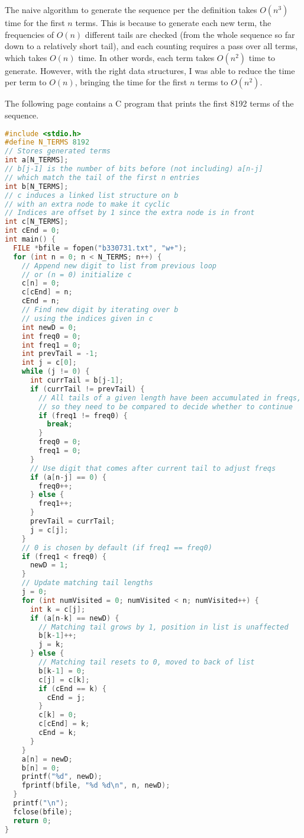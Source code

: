 \documentclass{article}
\begin{document}
The naive algorithm to generate the sequence per the definition
takes $O(n^3)$ time for the first $n$ terms.
This is because to generate each new term,
the frequencies of $O(n)$ different tails are checked
(from the whole sequence so far down to a relatively short tail),
and each counting requires a pass over all terms,
which takes $O(n)$ time.
In other words, each term takes $O(n^2)$ time to generate.
However, with the right data structures,
I was able to reduce the time per term to $O(n)$,
bringing the time for the first $n$ terms to $O(n^2)$.

The following page contains a C program
that prints the first 8192 terms of the sequence.

\newpage

\begin{lstlisting}[language=c]
#include <stdio.h>
#define N_TERMS 8192
// Stores generated terms
int a[N_TERMS];
// b[j-1] is the number of bits before (not including) a[n-j]
// which match the tail of the first n entries
int b[N_TERMS];
// c induces a linked list structure on b
// with an extra node to make it cyclic
// Indices are offset by 1 since the extra node is in front
int c[N_TERMS];
int cEnd = 0;
int main() {
  FILE *bfile = fopen("b330731.txt", "w+");
  for (int n = 0; n < N_TERMS; n++) {
    // Append new digit to list from previous loop
    // or (n = 0) initialize c
    c[n] = 0;
    c[cEnd] = n;
    cEnd = n;
    // Find new digit by iterating over b
    // using the indices given in c
    int newD = 0;
    int freq0 = 0;
    int freq1 = 0;
    int prevTail = -1;
    int j = c[0];
    while (j != 0) {
      int currTail = b[j-1];
      if (currTail != prevTail) {
        // All tails of a given length have been accumulated in freqs,
        // so they need to be compared to decide whether to continue
        if (freq1 != freq0) {
          break;
        }
        freq0 = 0;
        freq1 = 0;
      }
      // Use digit that comes after current tail to adjust freqs
      if (a[n-j] == 0) {
        freq0++;
      } else {
        freq1++;
      }
      prevTail = currTail;
      j = c[j];
    }
    // 0 is chosen by default (if freq1 == freq0)
    if (freq1 < freq0) {
      newD = 1;
    }
    // Update matching tail lengths
    j = 0;
    for (int numVisited = 0; numVisited < n; numVisited++) {
      int k = c[j];
      if (a[n-k] == newD) {
        // Matching tail grows by 1, position in list is unaffected
        b[k-1]++;
        j = k;
      } else {
        // Matching tail resets to 0, moved to back of list
        b[k-1] = 0;
        c[j] = c[k];
        if (cEnd == k) {
          cEnd = j;
        }
        c[k] = 0;
        c[cEnd] = k;
        cEnd = k;
      }
    }
    a[n] = newD;
    b[n] = 0;
    printf("%d", newD);
    fprintf(bfile, "%d %d\n", n, newD);
  }
  printf("\n");
  fclose(bfile);
  return 0;
}
\end{lstlisting}
\end{document}

